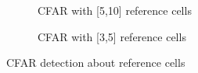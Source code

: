 \documentclass[12pt,DIV14,BCOR12mm,a4paper,footinclude=false,headinclude,parskip=half-,twoside,openright,cleardoublepage=empty,toc=index,bibliography=totoc,listof=totoc]{scrreprt}
\numberwithin{equation}{chapter}
\begin{document}
\begin{figure}[t]
    \centering
    \begin{subfigure}{0.45\textwidth}
        \centering
        \caption{CFAR with [5,10] reference cells}
    \end{subfigure}\hspace{0.5cm}
    \begin{subfigure}{0.45\textwidth}
        \centering
        \caption{CFAR with [3,5] reference cells}
    \end{subfigure}
    \caption{CFAR detection about reference cells}
    \label{cfar detection about reference cells}
\end{figure}
\end{document}
